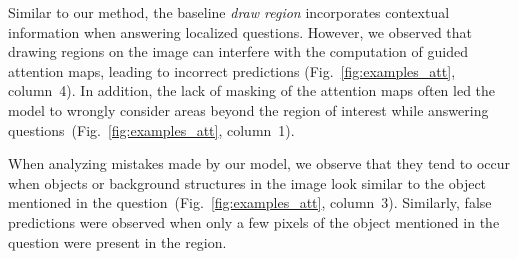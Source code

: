 
Similar to our method, the baseline \emph{draw region} incorporates contextual information when answering localized questions. However, we observed that drawing regions on the image can interfere with the computation of guided attention maps, leading to incorrect predictions (Fig.~\ref{fig:examples_att}, column~4). In addition, the lack of masking of the attention maps often led the model to wrongly consider areas beyond the region of interest while answering questions~(Fig.~\ref{fig:examples_att}, column~1). 

When analyzing mistakes made by our model, we observe that they tend to occur when objects or background structures in the image look similar to the object mentioned in the question~(Fig.~\ref{fig:examples_att}, column~3). Similarly, false predictions were observed when only a few pixels of the object mentioned in the question were present in the region.



